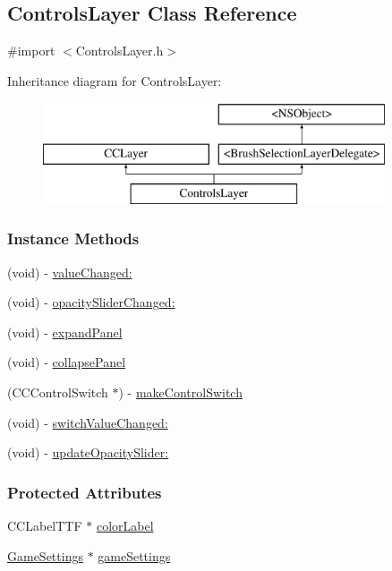 \hypertarget{interface_controls_layer}{\subsection{Controls\-Layer Class Reference}
\label{d1/d1a/interface_controls_layer}
}


{\ttfamily \#import $<$Controls\-Layer.\-h$>$}

Inheritance diagram for Controls\-Layer\-:\begin{figure}[H]
\begin{center}
\leavevmode
\includegraphics[height=3.000000cm]{d1/d1a/interface_controls_layer}
\end{center}
\end{figure}
\subsubsection*{Instance Methods}
\begin{DoxyCompactItemize}
\item 
(void) -\/ \hyperlink{interface_controls_layer_a883bebd74a6a657ded8e74a33ea13228}{value\-Changed\-:}
\item 
(void) -\/ \hyperlink{interface_controls_layer_a83c9c1fd8899606cca2535589c0f0b45}{opacity\-Slider\-Changed\-:}
\item 
(void) -\/ \hyperlink{interface_controls_layer_a9891f37671f87b622eb28a252e2e5190}{expand\-Panel}
\item 
(void) -\/ \hyperlink{interface_controls_layer_afddcb3b6b63d05a784b18cb129ec5643}{collapse\-Panel}
\item 
(C\-C\-Control\-Switch $\ast$) -\/ \hyperlink{interface_controls_layer_a17c02c66db2aa779b9b7af552eb43a46}{make\-Control\-Switch}
\item 
(void) -\/ \hyperlink{interface_controls_layer_a02affb06b2d595b54d10b3593a8370f2}{switch\-Value\-Changed\-:}
\item 
(void) -\/ \hyperlink{interface_controls_layer_a5d92a7806c63fd37b54b6071dfdc611b}{update\-Opacity\-Slider\-:}
\end{DoxyCompactItemize}
\subsubsection*{Protected Attributes}
\begin{DoxyCompactItemize}
\item 
C\-C\-Label\-T\-T\-F $\ast$ \hyperlink{interface_controls_layer_aa3d424dcbfa618632f97478ee61148cb}{color\-Label}
\item 
\hyperlink{interface_game_settings}{Game\-Settings} $\ast$ \hyperlink{interface_controls_layer_a6fb04c60ed1bfab11e2940a025b4927e}{game\-Settings}
\end{DoxyCompactItemize}
